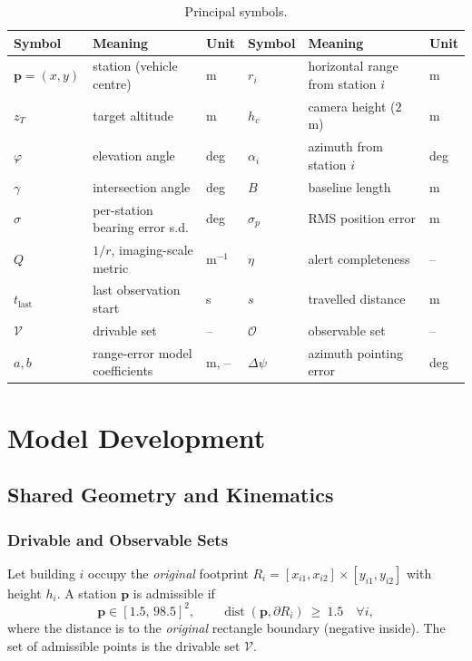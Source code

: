 \documentclass[12pt]{article}
\begin{document}
\begin{table}[htbp]
  \centering
  \caption{Principal symbols.}
  \label{tab:notation}
  \small
  \begin{tabular}{lll|lll}
    \toprule
    Symbol & Meaning & Unit & Symbol & Meaning & Unit \\
    \midrule
    $\bm p=(x,y)$ & station (vehicle centre) & m & $r_i$ & horizontal range from station $i$ & m \\
    $z_T$ & target altitude & m & $h_c$ & camera height ($2$ m) & m \\
    $\varphi$ & elevation angle & deg & $\alpha_i$ & azimuth from station $i$ & deg \\
    $\gamma$ & intersection angle & deg & $B$ & baseline length & m \\
    $\sigma$ & per-station bearing error s.d. & deg & $\sigma_p$ & RMS position error & m \\
    $Q$ & $1/r$, imaging-scale metric & $\mathrm{m^{-1}}$ & $\eta$ & alert completeness & -- \\
    $t_{\mathrm{last}}$ & last observation start & s & $s$ & travelled distance & m \\
    $\mathcal V$ & drivable set & -- & $\mathcal O$ & observable set & -- \\
    $a,b$ & range-error model coefficients & m, -- & $\Delta\psi$ & azimuth pointing error & deg \\
    \bottomrule
  \end{tabular}
\end{table}

\section{Model Development}

\subsection{Shared Geometry and Kinematics}

\subsubsection{Drivable and Observable Sets}

Let building $i$ occupy the \emph{original} footprint $R_i=[x_{i1},x_{i2}]\times[y_{i1},y_{i2}]$ with height $h_i$. A station $\bm p$ is admissible if
\begin{equation}
\label{eq:free}
\bm p\in[1.5,\,98.5]^2,\qquad \operatorname{dist}(\bm p,\partial R_i)\ \ge\ 1.5\quad\forall i,
\end{equation}
where the distance is to the \emph{original} rectangle boundary (negative inside). The set of admissible points is the drivable set $\mathcal V$.
\end{document}
